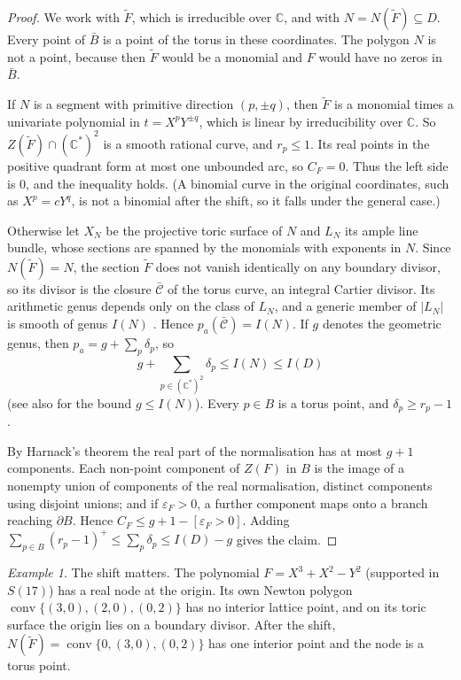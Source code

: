 \documentclass[11pt]{amsart}
\theoremstyle{definition}
\theoremstyle{remark}
\newtheorem{example}[theorem]{Example}
\newcommand{\C}{\mathbb{C}}
\newcommand{\conv}{\operatorname{conv}}
\numberwithin{equation}{section}
\begin{document}
\begin{proof}
We work with $\tilde F$, which is irreducible over $\C$, and with $N=N(\tilde F)\subseteq D$.
Every point of $\bar B$ is a point of the torus in these coordinates. The polygon $N$ is not
a point, because then $\tilde F$ would be a monomial and $F$ would have no zeros in $\bar B$.

If $N$ is a segment with primitive direction $(p,\pm q)$, then $\tilde F$ is a monomial times
a univariate polynomial in $t=X^pY^{\pm q}$, which is linear by irreducibility over $\C$. So
$Z(\tilde F)\cap(\C^*)^2$ is a smooth rational curve, and $r_p\le1$. Its real points in the
positive quadrant form at most one unbounded arc, so $C_F=0$. Thus the left side is $0$, and
the inequality holds. (A binomial curve in the original coordinates, such as $X^p=cY^q$, is not a
binomial after the shift, so it falls under the general case.)

Otherwise let $X_N$ be the projective toric surface of $N$ and $L_N$ its ample line bundle,
whose sections are spanned by the monomials with exponents in $N$. Since $N(\tilde F)=N$, the
section $\tilde F$ does not vanish identically on any boundary divisor, so its divisor is the
closure $\bar{\mathcal C}$ of the torus curve, an integral Cartier divisor. Its arithmetic
genus depends only on the class of $L_N$, and a generic member of $|L_N|$ is smooth of genus
$I(N)$ \cite{Khovanskii}. Hence $p_a(\bar{\mathcal C})=I(N)$. If $g$ denotes the geometric
genus, then $p_a=g+\sum_p\delta_p$, so
\[
g+\sum_{p\in(\C^*)^2}\delta_p\le I(N)\le I(D)
\]
(see also \cite{Beelen} for the bound $g\le I(N)$). Every $p\in B$ is a torus
point, and $\delta_p\ge r_p-1$.

By Harnack's theorem \cite{Harnack} the real part of the normalisation has at most $g+1$
components. Each non-point component of $Z(F)$ in $B$ is the image of a nonempty union of
components of the real normalisation, distinct components using disjoint unions; and if
$\varepsilon_F>0$, a further component maps onto a branch reaching $\partial B$. Hence
$C_F\le g+1-[\varepsilon_F>0]$. Adding $\sum_{p\in B}(r_p-1)^+\le\sum_p\delta_p\le I(D)-g$
gives the claim.
\end{proof}

\begin{example}
The shift matters. The polynomial $F=X^3+X^2-Y^2$ (supported in $S(17)$) has a real node at
the origin. Its own Newton polygon $\conv\{(3,0),(2,0),(0,2)\}$ has no interior lattice point,
and on its toric surface the origin lies on a boundary divisor. After the shift,
$N(\tilde F)=\conv\{0,(3,0),(0,2)\}$ has one interior point and the node is a torus point.
\end{example}
\end{document}
